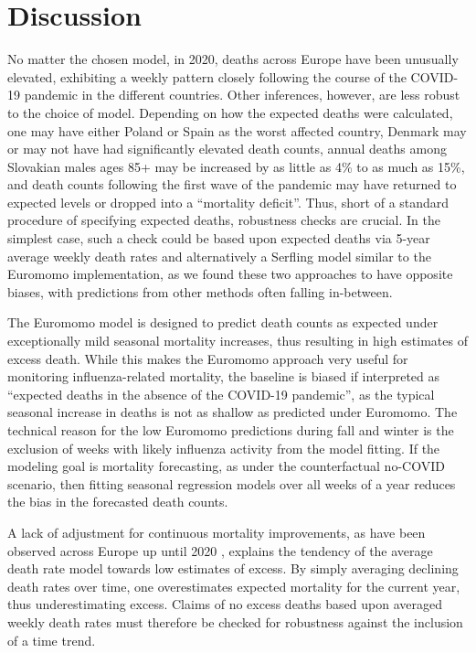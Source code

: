 \documentclass[10pt,letterpaper]{article}
\begin{document}
\section*{Discussion}

No matter the chosen model, in 2020, deaths across Europe have been unusually elevated, exhibiting a weekly pattern closely following the course of the COVID-19 pandemic in the different countries. Other inferences, however, are less robust to the choice of model. Depending on how the expected deaths were calculated, one may have either Poland or Spain as the worst affected country, Denmark may or may not have had significantly elevated death counts, annual deaths among Slovakian males ages 85+ may be increased by as little as 4\% to as much as 15\%, and death counts following the first wave of the pandemic may have returned to expected levels or dropped into a ``mortality deficit''. Thus, short of a standard procedure of specifying expected deaths, robustness checks are crucial. In the simplest case, such a check could be based upon expected deaths via 5-year average weekly death rates and alternatively a Serfling model similar to the Euromomo implementation, as we found these two approaches to have opposite biases, with predictions from other methods often falling in-between.

The Euromomo model is designed to predict death counts as expected under exceptionally mild seasonal mortality increases, thus resulting in high estimates of excess death. While this makes the Euromomo approach very useful for monitoring influenza-related mortality, the baseline is biased if interpreted as ``expected deaths in the absence of the COVID-19 pandemic'', as the typical seasonal increase in deaths is not as shallow as predicted under Euromomo. The technical reason for the low Euromomo predictions during fall and winter is the exclusion of weeks with likely influenza activity from the model fitting. If the modeling goal is mortality forecasting, as under the counterfactual no-COVID scenario, then fitting seasonal regression models over all weeks of a year reduces the bias in the forecasted death counts.

A lack of adjustment for continuous mortality improvements, as have been observed across Europe up until 2020 \cite{Leon2011, Aburto2021a}, explains the tendency of the average death rate model towards low estimates of excess. By simply averaging declining death rates over time, one overestimates expected mortality for the current year, thus underestimating excess. Claims of no excess deaths based upon averaged weekly death rates must therefore be checked for robustness against the inclusion of a time trend.
\end{document}
